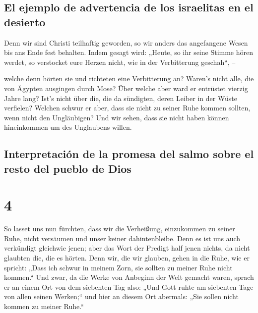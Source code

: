 \hypertarget{el-ejemplo-de-advertencia-de-los-israelitas-en-el-desierto}{%
\subsection{El ejemplo de advertencia de los israelitas en el
desierto}\label{el-ejemplo-de-advertencia-de-los-israelitas-en-el-desierto}}

 Denn wir sind Christi teilhaftig geworden, so wir anders
das angefangene Wesen bis ans Ende fest behalten.  Indem
gesagt wird: „Heute, so ihr seine Stimme hören werdet, so verstocket
eure Herzen nicht, wie in der Verbitterung geschah``, --

 welche denn hörten sie und richteten eine Verbitterung
an? Waren's nicht alle, die von Ägypten ausgingen durch Mose?
 Über welche aber ward er entrüstet vierzig Jahre lang?
Ist's nicht über die, die da sündigten, deren Leiber in der Wüste
verfielen?  Welchen schwur er aber, dass sie nicht zu
seiner Ruhe kommen sollten, wenn nicht den Ungläubigen? 
Und wir sehen, dass sie nicht haben können hineinkommen um des
Unglaubens willen.

\hypertarget{interpretaciuxf3n-de-la-promesa-del-salmo-sobre-el-resto-del-pueblo-de-dios}{%
\subsection{Interpretación de la promesa del salmo sobre el resto del
pueblo de
Dios}\label{interpretaciuxf3n-de-la-promesa-del-salmo-sobre-el-resto-del-pueblo-de-dios}}

\hypertarget{section-3}{%
\section{4}\label{section-3}}

 So lasset uns nun fürchten, dass wir die Verheißung,
einzukommen zu seiner Ruhe, nicht versäumen und unser keiner
dahintenbleibe.  Denn es ist uns auch verkündigt gleichwie
jenen; aber das Wort der Predigt half jenen nichts, da nicht glaubten
die, die es hörten.  Denn wir, die wir glauben, gehen in
die Ruhe, wie er spricht: „Dass ich schwur in meinem Zorn, sie sollten
zu meiner Ruhe nicht kommen.`` Und zwar, da die Werke von Anbeginn der
Welt gemacht waren,  sprach er an einem Ort von dem
siebenten Tag also: „Und Gott ruhte am siebenten Tage von allen seinen
Werken;``  und hier an diesem Ort abermals: „Sie sollen
nicht kommen zu meiner Ruhe.``

